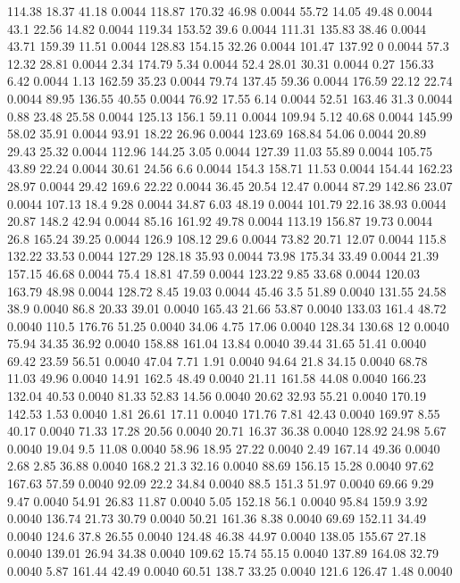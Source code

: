 114.38	18.37	41.18	0.0044
118.87	170.32	46.98	0.0044
55.72	14.05	49.48	0.0044
43.1	22.56	14.82	0.0044
119.34	153.52	39.6	0.0044
111.31	135.83	38.46	0.0044
43.71	159.39	11.51	0.0044
128.83	154.15	32.26	0.0044
101.47	137.92	0	0.0044
57.3	12.32	28.81	0.0044
2.34	174.79	5.34	0.0044
52.4	28.01	30.31	0.0044
0.27	156.33	6.42	0.0044
1.13	162.59	35.23	0.0044
79.74	137.45	59.36	0.0044
176.59	22.12	22.74	0.0044
89.95	136.55	40.55	0.0044
76.92	17.55	6.14	0.0044
52.51	163.46	31.3	0.0044
0.88	23.48	25.58	0.0044
125.13	156.1	59.11	0.0044
109.94	5.12	40.68	0.0044
145.99	58.02	35.91	0.0044
93.91	18.22	26.96	0.0044
123.69	168.84	54.06	0.0044
20.89	29.43	25.32	0.0044
112.96	144.25	3.05	0.0044
127.39	11.03	55.89	0.0044
105.75	43.89	22.24	0.0044
30.61	24.56	6.6	0.0044
154.3	158.71	11.53	0.0044
154.44	162.23	28.97	0.0044
29.42	169.6	22.22	0.0044
36.45	20.54	12.47	0.0044
87.29	142.86	23.07	0.0044
107.13	18.4	9.28	0.0044
34.87	6.03	48.19	0.0044
101.79	22.16	38.93	0.0044
20.87	148.2	42.94	0.0044
85.16	161.92	49.78	0.0044
113.19	156.87	19.73	0.0044
26.8	165.24	39.25	0.0044
126.9	108.12	29.6	0.0044
73.82	20.71	12.07	0.0044
115.8	132.22	33.53	0.0044
127.29	128.18	35.93	0.0044
73.98	175.34	33.49	0.0044
21.39	157.15	46.68	0.0044
75.4	18.81	47.59	0.0044
123.22	9.85	33.68	0.0044
120.03	163.79	48.98	0.0044
128.72	8.45	19.03	0.0044
45.46	3.5	51.89	0.0040
131.55	24.58	38.9	0.0040
86.8	20.33	39.01	0.0040
165.43	21.66	53.87	0.0040
133.03	161.4	48.72	0.0040
110.5	176.76	51.25	0.0040
34.06	4.75	17.06	0.0040
128.34	130.68	12	0.0040
75.94	34.35	36.92	0.0040
158.88	161.04	13.84	0.0040
39.44	31.65	51.41	0.0040
69.42	23.59	56.51	0.0040
47.04	7.71	1.91	0.0040
94.64	21.8	34.15	0.0040
68.78	11.03	49.96	0.0040
14.91	162.5	48.49	0.0040
21.11	161.58	44.08	0.0040
166.23	132.04	40.53	0.0040
81.33	52.83	14.56	0.0040
20.62	32.93	55.21	0.0040
170.19	142.53	1.53	0.0040
1.81	26.61	17.11	0.0040
171.76	7.81	42.43	0.0040
169.97	8.55	40.17	0.0040
71.33	17.28	20.56	0.0040
20.71	16.37	36.38	0.0040
128.92	24.98	5.67	0.0040
19.04	9.5	11.08	0.0040
58.96	18.95	27.22	0.0040
2.49	167.14	49.36	0.0040
2.68	2.85	36.88	0.0040
168.2	21.3	32.16	0.0040
88.69	156.15	15.28	0.0040
97.62	167.63	57.59	0.0040
92.09	22.2	34.84	0.0040
88.5	151.3	51.97	0.0040
69.66	9.29	9.47	0.0040
54.91	26.83	11.87	0.0040
5.05	152.18	56.1	0.0040
95.84	159.9	3.92	0.0040
136.74	21.73	30.79	0.0040
50.21	161.36	8.38	0.0040
69.69	152.11	34.49	0.0040
124.6	37.8	26.55	0.0040
124.48	46.38	44.97	0.0040
138.05	155.67	27.18	0.0040
139.01	26.94	34.38	0.0040
109.62	15.74	55.15	0.0040
137.89	164.08	32.79	0.0040
5.87	161.44	42.49	0.0040
60.51	138.7	33.25	0.0040
121.6	126.47	1.48	0.0040

